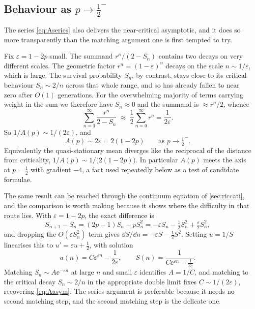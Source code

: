 \subsection{Behaviour as \texorpdfstring{$p\to\tfrac12^-$}{p to 1/2}}
\label{sec:asymptotic}

The series \cref{eq:Aseries} also delivers the near-critical asymptotic, and it does so
more transparently than the matching argument one is first tempted to try.

Fix $\varepsilon=1-2p$ small. The summand $r^n/(2-S_n)$ contains two decays on very
different scales. The geometric factor $r^n = (1-\varepsilon)^n$ decays on the scale
$n\sim1/\varepsilon$, which is large. The survival probability $S_n$, by contrast, stays
close to its critical behaviour $S_n\sim2/n$ across that whole range, and so has already
fallen to near zero after $O(1)$ generations. For the overwhelming majority of terms
carrying weight in the sum we therefore have $S_n\approx0$ and the summand is
$\approx r^n/2$, whence
\begin{equation*}
\sum_{n=0}^{\infty}\frac{r^n}{2-S_n}
\;\approx\;
\frac12\sum_{n=0}^{\infty}r^n = \frac{1}{2\varepsilon} .
\end{equation*}
So $1/A(p)\sim1/(2\varepsilon)$, and
\begin{equation}
\label{eq:Aasym}
\boxed{\;A(p) \sim 2\varepsilon = 2(1-2p)\qquad\text{as } p\to\tfrac12^- .\;}
\end{equation}
Equivalently the quasi-stationary mean diverges like the reciprocal of the distance from
criticality, $1/A(p)\sim1/\bigl(2(1-2p)\bigr)$. In particular $A(p)$ meets the axis at
$p=\tfrac12$ with gradient $-4$, a fact used repeatedly below as a test of candidate
formulae.

The same result can be reached through the continuum equation of \cref{sec:riccati}, and
the comparison is worth making because it shows where the difficulty in that route lies.
With $\varepsilon=1-2p$, the exact difference is
\begin{equation*}
S_{n+1}-S_n = (2p-1)S_n - pS_n^2
= -\varepsilon S_n - \tfrac12 S_n^2 + \tfrac{\varepsilon}{2}S_n^2 ,
\end{equation*}
and dropping the $O(\varepsilon S_n^2)$ term gives
$\dd S/\dd n = -\varepsilon S - \tfrac12 S^2$. Setting $u=1/S$ linearises this to
$u' = \varepsilon u + \tfrac12$, with solution
\begin{equation*}
u(n) = C\ee^{\varepsilon n} - \frac{1}{2\varepsilon},
\qquad
S(n) = \frac{1}{C\ee^{\varepsilon n} - \frac{1}{2\varepsilon}} .
\end{equation*}
Matching $S_n\sim A\ee^{-\varepsilon n}$ at large $n$ and small $\varepsilon$ identifies
$A=1/C$, and matching to the critical decay $S_n\sim2/n$ in the appropriate double limit
fixes $C\sim1/(2\varepsilon)$, recovering \cref{eq:Aasym}. The series argument is
preferable because it needs no second matching step, and the second matching step is the
delicate one.


